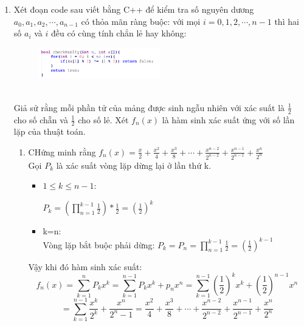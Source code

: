 \documentclass[12pt,a4paper]{article}
\begin{document}
\begin{enumerate}[label=\textbf{Câu 2:} ]
    \item Xét đoạn code sau viết bằng C++ để kiểm tra số nguyên dương $a_{0},a_{1},a_{2},\cdots,a_{n-1} $ có thỏa mãn ràng buộc: với mọi $i=0,1,2,\cdots,n-1 $ thì hai số  $a_{i} $ và $i $ đều có cùng tính chẳn lẻ hay không:
          \begin{figure}[h] %
              \centering
              \includegraphics[width=0.5\textwidth]{img2.png} %
              \label{fig:hinh_anh}
          \end{figure}
          \\
          Giả sử rằng mỗi phần tử của mảng được sinh ngẫu nhiên với xác suất là $\frac{1}{2} $ cho số chẵn và $\frac{1}{2}$ cho số lẻ. Xét $f_{n}(x) $ là hàm sinh xác suất ứng với số lần lặp của thuật toán.
          \begin{enumerate}[label=\alph*)]
              \item CHứng minh rằng $f_{n}(x)=\frac{x}{2}+\frac{x^2}{4}+\frac{x^3}{8}+\cdots+\frac{x^{n-2}}{2^{n-2}}+\frac{x^{n-1}}{2^{n-1}}+\frac{x^{n}}{2^{n}}$\\
              Gọi $P_{k} $ là xác suất vòng lặp dừng lại ở lần thứ k.
              \begin{itemize}[label=$\bullet$]
                \item $1 \leq k\leq n-1:$
                \begin{center}
                    $P_{k}=(\prod_{n = 1}^{k-1}\frac{1}{2})*\frac{1}{2}=(\frac{1}{2})^{k}  $
                \end{center}
                \item k=n:\\
                Vòng lặp bắt buộc phải dừng:
                    $P_{k}=P_{n}=\prod_{n = 1}^{k-1}\frac{1}{2}=(\frac{1}{2})^{k-1}$
              \end{itemize}
              Vậy khi đó hàm sinh xác suất:\\
              \[f_{n}(x)=\sum_{k = 1}^{n}P_{k}x^k=\sum_{k = 1}^{n-1}P_{k}x^k+p_{n}x^n=\sum_{k = 1}^{n-1}(\frac{1}{2})^kx^k+(\frac{1}{2})^{n-1}x^n\]
              \[=\sum_{k = 1}^{n-1}\frac{x^k}{2^k}+\frac{x^n}{2^n-1}=\frac{x^2}{4}+\frac{x^3}{8}+\cdots+\frac{x^{n-2}}{2^{n-2}}+\frac{x^{n-1}}{2^{n-1}}+\frac{x^{n}}{2^{n}}\]

\end{enumerate}
\end{enumerate}
\end{document}
